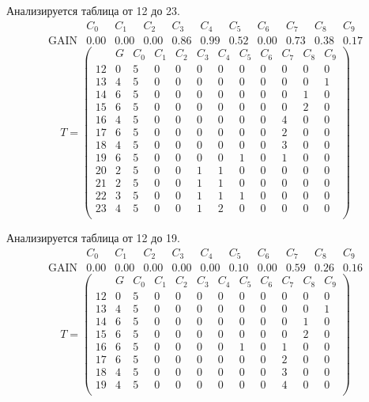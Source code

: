 Анализируется таблица от 12 до 23.
$$ 
\begin{array}{lcccc|c|ccccc}
	  & C_{0} & C_{1} & C_{2} & C_{3} & C_{4} & C_{5} & C_{6} & C_{7} & C_{8} & C_{9}\\
 \textrm{GAIN} & 0.00 & 0.00 & 0.00 & 0.86 & 0.99 & 0.52 & 0.00 & 0.73 & 0.38 & 0.17
\end{array}
 $$
$$
T = \left( \begin{array}{lccccc|c|ccccc}
	 & G & C_{0} & C_{1} & C_{2} & C_{3} & C_{4} & C_{5} & C_{6} & C_{7} & C_{8} & C_{9}\\
	12 & 0 & 5 & 0 & 0 & 0 & 0 & 0 & 0 & 0 & 0 & 0\\
	13 & 4 & 5 & 0 & 0 & 0 & 0 & 0 & 0 & 0 & 0 & 1\\
	14 & 6 & 5 & 0 & 0 & 0 & 0 & 0 & 0 & 0 & 1 & 0\\
	15 & 6 & 5 & 0 & 0 & 0 & 0 & 0 & 0 & 0 & 2 & 0\\
	16 & 4 & 5 & 0 & 0 & 0 & 0 & 0 & 0 & 4 & 0 & 0\\
	17 & 6 & 5 & 0 & 0 & 0 & 0 & 0 & 0 & 2 & 0 & 0\\
	18 & 4 & 5 & 0 & 0 & 0 & 0 & 0 & 0 & 3 & 0 & 0\\
	19 & 6 & 5 & 0 & 0 & 0 & 0 & 1 & 0 & 1 & 0 & 0\\
	20 & 2 & 5 & 0 & 0 & 1 & 1 & 0 & 0 & 0 & 0 & 0\\
	21 & 2 & 5 & 0 & 0 & 1 & 1 & 0 & 0 & 0 & 0 & 0\\
	22 & 3 & 5 & 0 & 0 & 1 & 1 & 1 & 0 & 0 & 0 & 0\\
	23 & 4 & 5 & 0 & 0 & 1 & 2 & 0 & 0 & 0 & 0 & 0\\
\end{array} \right)
$$

Анализируется таблица от 12 до 19.
$$ 
\begin{array}{lccccccc|c|cc}
	  & C_{0} & C_{1} & C_{2} & C_{3} & C_{4} & C_{5} & C_{6} & C_{7} & C_{8} & C_{9}\\
 \textrm{GAIN} & 0.00 & 0.00 & 0.00 & 0.00 & 0.00 & 0.10 & 0.00 & 0.59 & 0.26 & 0.16
\end{array}
 $$
$$
T = \left( \begin{array}{lcccccccc|c|cc}
	 & G & C_{0} & C_{1} & C_{2} & C_{3} & C_{4} & C_{5} & C_{6} & C_{7} & C_{8} & C_{9}\\
	12 & 0 & 5 & 0 & 0 & 0 & 0 & 0 & 0 & 0 & 0 & 0\\
	13 & 4 & 5 & 0 & 0 & 0 & 0 & 0 & 0 & 0 & 0 & 1\\
	14 & 6 & 5 & 0 & 0 & 0 & 0 & 0 & 0 & 0 & 1 & 0\\
	15 & 6 & 5 & 0 & 0 & 0 & 0 & 0 & 0 & 0 & 2 & 0\\
	16 & 6 & 5 & 0 & 0 & 0 & 0 & 1 & 0 & 1 & 0 & 0\\
	17 & 6 & 5 & 0 & 0 & 0 & 0 & 0 & 0 & 2 & 0 & 0\\
	18 & 4 & 5 & 0 & 0 & 0 & 0 & 0 & 0 & 3 & 0 & 0\\
	19 & 4 & 5 & 0 & 0 & 0 & 0 & 0 & 0 & 4 & 0 & 0\\
\end{array} \right)
$$

